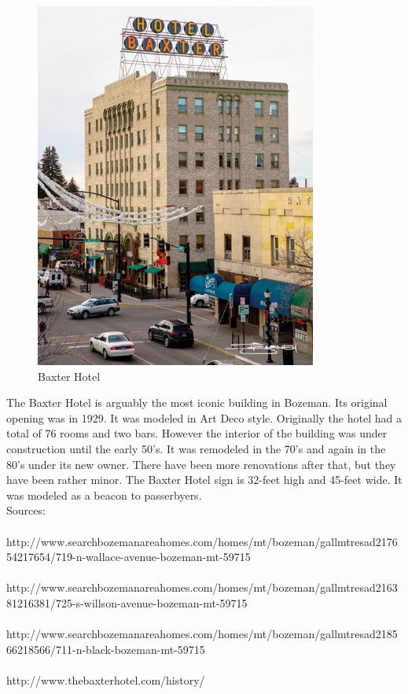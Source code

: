 \documentclass[10pt,letterpaper]{article}
\begin{document}
\begin{figure}[h]
\begin{minipage}[b]{0.25\textwidth}
    		\includegraphics[width=\textwidth]{house4pic2.jpg}
    		\caption{Baxter Hotel}
  		\end{minipage}
\end{figure}

The Baxter Hotel is arguably the most iconic building in Bozeman. Its original opening was in 1929. It was modeled in Art Deco style. Originally the hotel had a total of 76 rooms and two bars. However the interior of the building was under construction until the early 50's. It was remodeled in the 70's and again in the 80's under its new owner. There have been more renovations after that, but they have been rather minor. The Baxter Hotel sign is 32-feet high and 45-feet wide. It was modeled as a beacon to passerbyers.
\\
Sources:\\
\\
http://www.searchbozemanareahomes.com/homes/mt/bozeman/gallmtresad217654217654/719-n-wallace-avenue-bozeman-mt-59715
\\\\
http://www.searchbozemanareahomes.com/homes/mt/bozeman/gallmtresad216381216381/725-s-willson-avenue-bozeman-mt-59715
\\\\
http://www.searchbozemanareahomes.com/homes/mt/bozeman/gallmtresad218566218566/711-n-black-bozeman-mt-59715
\\\\
http://www.thebaxterhotel.com/history/
\end{document}
